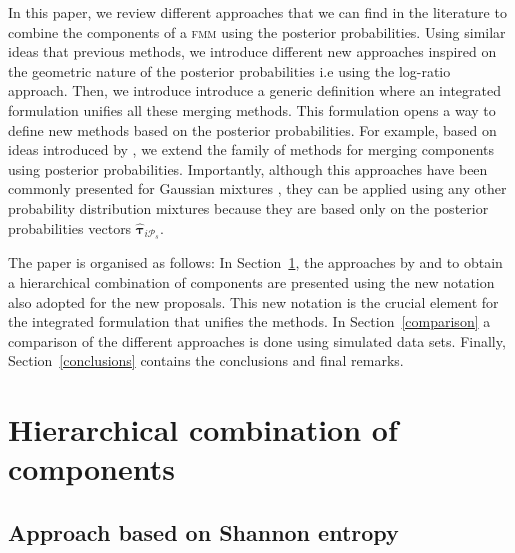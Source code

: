 \documentclass[10pt, a4paper]{article}
\newcommand{\m}[1]{\boldsymbol{#1}}
\newcommand{\fmm}{\textsc{fmm}\xspace}
\begin{document}
\begin{spacing}{1.9}
In this paper, we review different approaches that we can find in the literature \citep{baudry2010combining, hennig2010methods} to combine the components of a \fmm using the posterior probabilities. Using similar ideas that previous methods, we introduce different new approaches inspired on the geometric nature of the posterior probabilities i.e using the log-ratio approach. Then, we introduce  introduce a generic definition where an integrated formulation unifies all these merging methods.  This formulation opens a way to define new methods based on the posterior probabilities. For example, based on ideas introduced by \cite{longford2014}, we extend the family of methods for merging components using posterior probabilities.  Importantly, although this approaches have been commonly presented for Gaussian mixtures \citep{longford2014,melnykov2013distribution,hennig2010methods,baudry2010combining}, they can be applied using any other probability distribution mixtures because they are based only on the posterior probabilities vectors $\hat{\m\tau}_{i \mathcal{P}_s}$.

The paper is organised as follows: In Section~\ref{old_methods}, the approaches by \cite{hennig2010methods} and \cite{baudry2010combining} to obtain a hierarchical combination of components are presented using the new notation also adopted for the new proposals. This new notation is the crucial element for the integrated formulation that unifies the methods. In Section~\ref{comparison} a comparison of the different approaches is done using simulated data sets. Finally, Section~\ref{conclusions} contains the conclusions and final remarks.


\section{Hierarchical combination of components}
\label{old_methods}


\subsection{Approach based on Shannon entropy}


\end{spacing}
\end{document}
